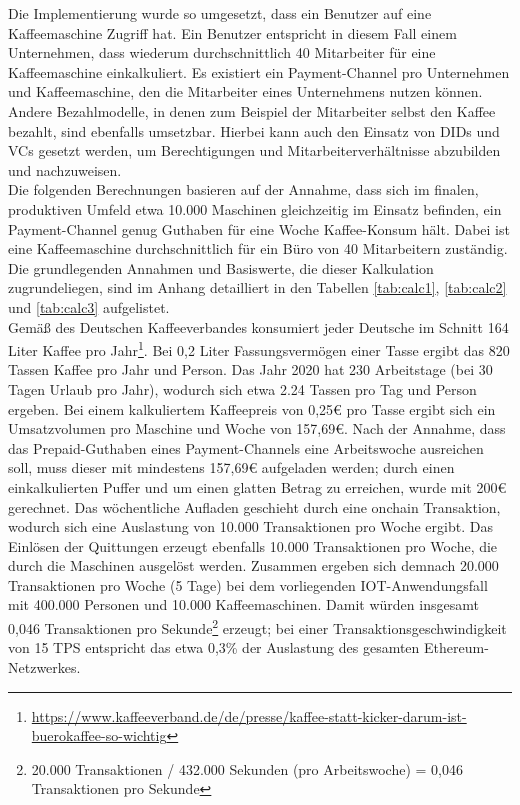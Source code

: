 Die Implementierung wurde so umgesetzt, dass ein Benutzer auf eine Kaffeemaschine Zugriff hat. Ein Benutzer entspricht in diesem Fall einem Unternehmen, dass wiederum durchschnittlich 40 Mitarbeiter für eine Kaffeemaschine einkalkuliert. Es existiert ein Payment-Channel pro Unternehmen und Kaffeemaschine, den die Mitarbeiter eines Unternehmens nutzen können. Andere Bezahlmodelle, in denen zum Beispiel der Mitarbeiter selbst den Kaffee bezahlt, sind ebenfalls umsetzbar. Hierbei kann auch den Einsatz von \ac{DID}s und \ac{VC}s gesetzt werden, um Berechtigungen und Mitarbeiterverhältnisse abzubilden und nachzuweisen.\\

Die folgenden Berechnungen basieren auf der Annahme, dass sich im finalen, produktiven Umfeld etwa 10.000 Maschinen gleichzeitig im Einsatz befinden, ein Payment-Channel genug Guthaben für eine Woche Kaffee-Konsum hält. Dabei ist eine Kaffeemaschine durchschnittlich für ein Büro von 40 Mitarbeitern zuständig. Die grundlegenden Annahmen und Basiswerte, die dieser Kalkulation zugrundeliegen, sind im Anhang detailliert in den Tabellen \ref{tab:calc1}, \ref{tab:calc2} und \ref{tab:calc3} aufgelistet.\\
Gemäß des Deutschen Kaffeeverbandes konsumiert jeder Deutsche im Schnitt 164 Liter Kaffee pro Jahr\footnote{\url{https://www.kaffeeverband.de/de/presse/kaffee-statt-kicker-darum-ist-buerokaffee-so-wichtig}}. Bei 0,2 Liter Fassungsvermögen einer Tasse ergibt das 820 Tassen Kaffee pro Jahr und Person. Das Jahr 2020 hat 230 Arbeitstage (bei 30 Tagen Urlaub pro Jahr), wodurch sich etwa 2.24 Tassen pro Tag und Person ergeben. Bei einem kalkuliertem Kaffeepreis von 0,25€ pro Tasse ergibt sich ein Umsatzvolumen pro Maschine und Woche von 157,69€. Nach der Annahme, dass das Prepaid-Guthaben eines Payment-Channels eine Arbeitswoche ausreichen soll, muss dieser mit mindestens 157,69€ aufgeladen werden; durch einen einkalkulierten Puffer und um einen glatten Betrag zu erreichen, wurde mit 200€ gerechnet. Das wöchentliche Aufladen geschieht durch eine onchain Transaktion, wodurch sich eine Auslastung von 10.000 Transaktionen pro Woche ergibt. Das Einlösen der Quittungen erzeugt ebenfalls 10.000 Transaktionen pro Woche, die durch die Maschinen ausgelöst werden. Zusammen ergeben sich demnach 20.000 Transaktionen pro Woche (5 Tage) bei dem vorliegenden IOT-Anwendungsfall mit 400.000 Personen und 10.000 Kaffeemaschinen. Damit würden insgesamt 0,046 Transaktionen pro Sekunde\footnote{20.000 Transaktionen / 432.000 Sekunden (pro Arbeitswoche) = 0,046 Transaktionen pro Sekunde} erzeugt; bei einer Transaktionsgeschwindigkeit von 15 \ac{TPS} entspricht das etwa 0,3\% der Auslastung des gesamten Ethereum-Netzwerkes.\\

